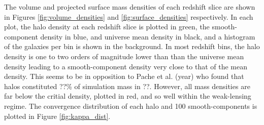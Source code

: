 \documentclass[%
 reprint,
 amsmath,amssymb,
 aps,nofootinbib
]{revtex4-1}
\begin{document}
The volume and projected surface mass densities of each redshift slice are shown in Figures \ref{fig:volume_densities} and \ref{fig:surface_densities} respectively. In each plot, the halo density at each redshift slice is plotted in green, the smooth-component density in blue, and universe mean density in black, and a histogram of the galaxies per bin is shown in the background. In most redshift bins, the halo density is one to two orders of magnitude lower than than the universe mean density leading to a smooth-component density very close to that of the mean density. This seems to be in opposition to Pache et al. (year) \cite{pache} who found that halos constituted ??\% of simulation mass in ??. However, all mass densities are far below the critial density, plotted in red, and so well within the weak-lensing regime. The convergence distribution of each halo and 100 smooth-components is plotted in Figure \ref{fig:kappa_dist}.
\end{document}
